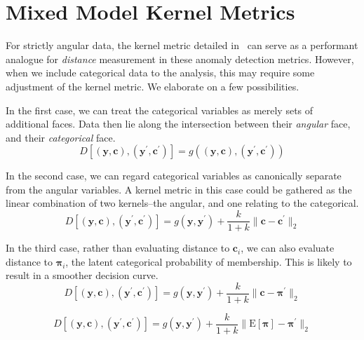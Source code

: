 \section{Mixed Model Kernel Metrics}
For strictly angular data, the kernel metric detailed in~\cite{trubey:pg} can 
  serve as a performant analogue for \emph{distance} measurement in these 
  anomaly detection metrics.  However, when we include categorical data to the 
  analysis, this may require some adjustment of the kernel metric.  We elaborate 
  on a few possibilities.

In the first case, we can treat the categorical variables as merely sets of 
  additional faces.  Data then lie along the intersection between their 
  \emph{angular} face, and their \emph{categorical} face.
  \begin{equation}
    D\left[(\bm{y},\bm{c}), (\bm{y}^{\prime}, \bm{c}^{\prime})\right] = 
        g\left((\bm{y},\bm{c}), (\bm{y}^{\prime}, \bm{c}^{\prime})\right)
  \end{equation}

In the second case, we can regard categorical variables as canonically separate 
  from the angular variables. A kernel metric in this case could be gathered as 
  the linear combination of two kernels--the angular, and one relating to the 
  categorical.  
  \begin{equation*}
    D\left[(\bm{y},\bm{c}), (\bm{y}^{\prime}, \bm{c}^{\prime})\right] = 
      g(\bm{y},\bm{y}^{\prime}) + 
          \frac{k}{1 + k}\lVert \bm{c} - \bm{c}^{\prime}\rVert_2
  \end{equation*}
    
In the third case, rather than evaluating distance to $\bm{c}_i$, we can also 
  evaluate distance to $\bm{\pi}_i$, the latent categorical probability of 
  membership.  This is likely to result in a smoother decision curve.
  \begin{equation*}
    D\left[(\bm{y},\bm{c}), (\bm{y}^{\prime}, \bm{c}^{\prime})\right] = 
      g(\bm{y},\bm{y}^{\prime}) + 
          \frac{k}{1 + k}\lVert \bm{c} - \bm{\pi}^{\prime}\rVert_2
  \end{equation*}

  \[
    D\left[(\bm{y},\bm{c}), (\bm{y}^{\prime}, \bm{c}^{\prime})\right] = 
      g(\bm{y},\bm{y}^{\prime}) + 
          \frac{k}{1 + k}\lVert \text{E}[\bm{\pi}] - \bm{\pi}^{\prime}\rVert_2
  \]

